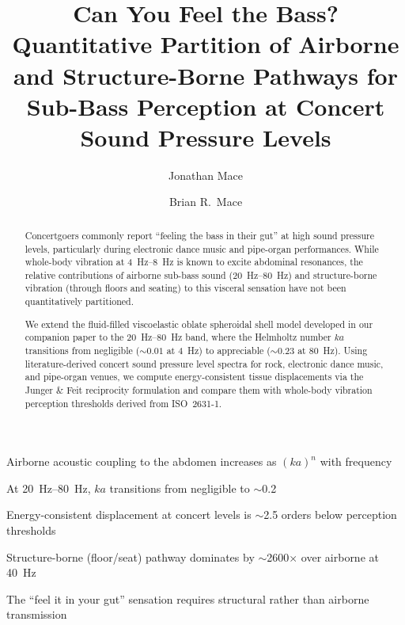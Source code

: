 \documentclass[review]{elsarticle}
\begin{document}
\begin{frontmatter}

\title{Can You Feel the Bass? Quantitative Partition of Airborne and
Structure-Borne Pathways for Sub-Bass Perception at Concert Sound
Pressure Levels}

\author[msr]{Jonathan Mace}

\author[auckland]{Brian R.\ Mace}



\begin{highlights}
\item Airborne acoustic coupling to the abdomen increases as $(ka)^n$ with frequency
\item At \SIrange{20}{80}{\hertz}, $ka$ transitions from negligible to $\sim$0.2
\item Energy-consistent displacement at concert levels is $\sim$\num{2.5} orders below perception thresholds
\item Structure-borne (floor/seat) pathway dominates by $\sim$\num{2600}$\times$ over airborne at \SI{40}{\hertz}
\item The ``feel it in your gut'' sensation requires structural rather than airborne transmission
\end{highlights}

\begin{abstract}
Concertgoers commonly report ``feeling the bass in their gut'' at high
sound pressure levels, particularly during electronic dance music and
pipe-organ performances.  While whole-body vibration at
\SIrange{4}{8}{\hertz} is known to excite abdominal resonances, the
relative contributions of airborne sub-bass sound
(\SIrange{20}{80}{\hertz}) and structure-borne vibration (through floors
and seating) to this visceral sensation have not been quantitatively
partitioned.

We extend the fluid-filled viscoelastic oblate spheroidal shell model
developed in our companion paper to the \SIrange{20}{80}{\hertz} band,
where the Helmholtz number $ka$ transitions from negligible
(${\sim}\num{0.01}$ at \SI{4}{\hertz}) to appreciable (${\sim}\num{0.23}$
at \SI{80}{\hertz}).  Using literature-derived concert sound pressure
level spectra for rock, electronic dance music, and pipe-organ venues,
we compute energy-consistent tissue displacements via the Junger \& Feit
reciprocity formulation and compare them with whole-body vibration
perception thresholds derived from ISO~2631-1.


\end{abstract}
\end{frontmatter}
\end{document}

